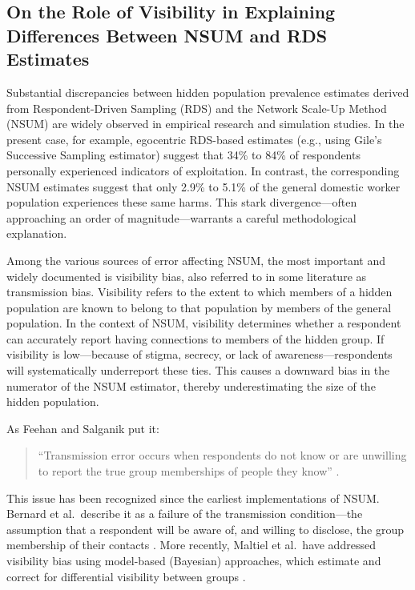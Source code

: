 \documentclass[
  12pt,
  letterpaper,
  DIV=11,
  numbers=noendperiod]{scrartcl}
\theoremstyle{plain}
\theoremstyle{definition}
\begin{document}
\subsection{On the Role of Visibility in Explaining Differences Between
NSUM and RDS
Estimates}\label{on-the-role-of-visibility-in-explaining-differences-between-nsum-and-rds-estimates}

Substantial discrepancies between hidden population prevalence estimates
derived from Respondent-Driven Sampling (RDS) and the Network Scale-Up
Method (NSUM) are widely observed in empirical research and simulation
studies. In the present case, for example, egocentric RDS-based
estimates (e.g., using Gile's Successive Sampling estimator) suggest
that 34\% to 84\% of respondents personally experienced indicators of
exploitation. In contrast, the corresponding NSUM estimates suggest that
only 2.9\% to 5.1\% of the general domestic worker population
experiences these same harms. This stark divergence---often approaching
an order of magnitude---warrants a careful methodological explanation.

Among the various sources of error affecting NSUM, the most important
and widely documented is visibility bias, also referred to in some
literature as transmission bias. Visibility refers to the extent to
which members of a hidden population are known to belong to that
population by members of the general population. In the context of NSUM,
visibility determines whether a respondent can accurately report having
connections to members of the hidden group. If visibility is
low---because of stigma, secrecy, or lack of awareness---respondents
will systematically underreport these ties. This causes a downward bias
in the numerator of the NSUM estimator, thereby underestimating the size
of the hidden population.

As Feehan and Salganik put it:

\begin{quote}
``Transmission error occurs when respondents do not know or are
unwilling to report the true group memberships of people they know''
\autocite[155]{feeh16-generalizing}.
\end{quote}

This issue has been recognized since the earliest implementations of
NSUM. Bernard et al.~describe it as a failure of the transmission
condition---the assumption that a respondent will be aware of, and
willing to disclose, the group membership of their contacts
\autocite{bern10-counting}. More recently, Maltiel et al.~have addressed
visibility bias using model-based (Bayesian) approaches, which estimate
and correct for differential visibility between groups
\autocite{malt15-estimating}.
\end{document}
